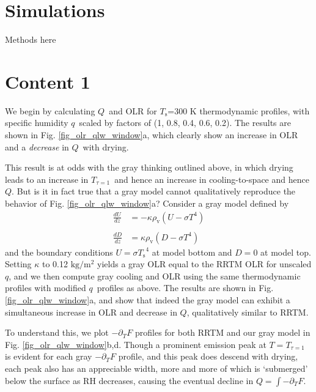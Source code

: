 \documentclass[10pt]{article}
\newcommand{\n}{\nonumber}
\newcommand{\der}[2]{\ensuremath{\frac{d #1}{d #2}}}
\newcommand{\ppt}{\ensuremath{\partial_T}}
\newcommand{\QLW}{\ensuremath{Q}}
\newcommand{\Tone}{\ensuremath{T_{\tau=1}}}
\newcommand{\qv}{\ensuremath{q}}
\newcommand{\rhov}{\ensuremath{\rho_\mathrm{v}}}
\newcommand{\Ts}{\ensuremath{T_\mathrm{s}}}
\begin{document}
\section{Simulations}
Methods here	



\section{Content 1}
We begin by calculating \QLW\ and OLR for \Ts=300 K thermodynamic profiles, with specific humidity \qv\ scaled by factors of (1, 0.8, 0.4, 0.6, 0.2). The results are shown in Fig. \ref{fig_olr_qlw_window}a, which clearly show an increase in OLR and a \emph{decrease} in \QLW\ with drying. 

This result is at odds with the gray thinking outlined above, in which drying leads to an increase in \Tone\ and hence an increase in cooling-to-space and hence \QLW. But is it in fact true that a gray model cannot qualitatively reproduce the behavior of Fig. \ref{fig_olr_qlw_window}a? Consider a gray model defined by 
	\begin{subequations}
	\begin{align}
			\der{U}{z} & = - \kappa \rhov (U-\sigma T^4) \\
			  		& \n \\
			\der{D}{z} & = \kappa \rhov (D-\sigma T^4) 
	\end{align}			
	\label{eqn_gray_model}
	\end{subequations}
and the boundary conditions $U = \sigma \Ts^4$ at model bottom and $D=0$ at model top. Setting $\kappa$ to 0.12 $\mathrm{kg/m^2}$ yields a gray OLR equal to the RRTM OLR for unscaled \qv, and we then compute gray cooling and OLR using the same thermodynamic profiles with modified \qv\ profiles as above. The results are shown in Fig. \ref{fig_olr_qlw_window}a, and show that indeed the gray model can exhibit a simultaneous increase in OLR and decrease in \QLW, qualitatively similar to RRTM.

To understand this, we plot $-\ppt F$ profiles for both RRTM and our gray model in Fig. \ref{fig_olr_qlw_window}b,d. Though a prominent emission peak at $T=\Tone$ is evident for each gray $-\ppt F$ profile, and this peak does descend with drying, each peak also has an appreciable width, more and more of which is `submerged' below the surface as RH decreases, causing the eventual decline in $\QLW = \int - \ppt F$.
\end{document}
